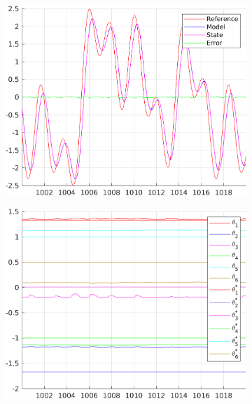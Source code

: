 \documentclass[12pt,a4paper]{article}
\begin{document}
	\begin{figure}[H]
		\centering
		\begin{subfigure}{.45\textwidth}
			\centering
			\includegraphics[width=1\textwidth]{Graphics/NonLinearState3.png}
		\end{subfigure}%
		\begin{subfigure}{.45\textwidth}
			\centering
			\includegraphics[width=1\textwidth]{Graphics/NonLinearParameters3.png}
		\end{subfigure}
		\begin{subfigure}{.45\textwidth}
			\centering

\end{subfigure}
\end{figure}
\end{document}

